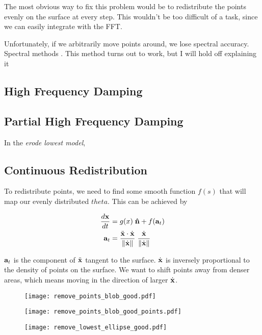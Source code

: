 The most obvious way to fix this problem would be to redistribute the points evenly on the surface at every step. This wouldn't be too difficult of a task, since we can easily integrate with the FFT. 

Unfortunately, if we arbitrarily move points around, we lose spectral accuracy. Spectral methods . This method turns out to work, but I will hold off explaining it 

\subsection*{High Frequency Damping}


\subsection*{Partial High Frequency Damping}

In the \textit{erode lowest model}, 

\subsection*{Continuous Redistribution}

To redistribute points, we need to find some smooth function $f(s)$ that will map our evenly distributed $theta$. This can be achieved by 

\begin{align}
  \frac{d\bvec{x}}{dt}& = g(x) \; \bhat{n} + f(\bvec{a}_t)\\
  \bvec{a}_t& = \frac{\ddot{\bvec{x}} \cdot \dot{\bvec{x}}}{\norm{\dot{\bvec{x}}}} \; \frac{\dot{\bvec{x}}}{\norm{\dot{\bvec{x}}}}
\end{align}

$\mathbf{a}_t$ is the component of $\ddot{\mathbf{x}}$ tangent to the surface. $\dot{\mathbf{x}}$ is inversely proportional to the density of points on the surface. We want to shift points away from denser areas, which means moving in the direction of larger $\dot{\mathbf{x}}$.

\begin{figure}[H]
    \begin{center}
      \texttt{[image: remove\_points\_blob\_good.pdf]}
    \end{center}
  \vspace{-.2in} %
  \caption{\label{fig:remove-points-blob-good}}
\end{figure}

\begin{figure}[H]
    \begin{center}
      \texttt{[image: remove\_points\_blob\_good\_points.pdf]}
    \end{center}
  \vspace{-.2in} %
  \caption{\label{fig:remove-points-blob-good-points}}
\end{figure}

\begin{figure}[H]
    \begin{center}
      \texttt{[image: remove\_lowest\_ellipse\_good.pdf]}
    \end{center}
  \vspace{-.2in} %
  \caption{\label{fig:remove-lowest-ellipse-good}}
\end{figure}




